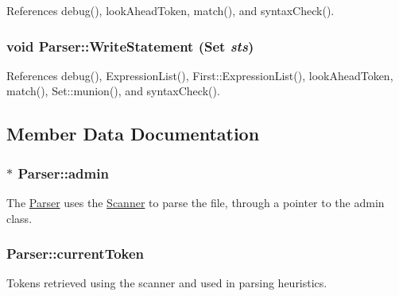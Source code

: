 References debug(), lookAheadToken, match(), and syntaxCheck().

\hypertarget{classParser_a092a51a38e65c3be07328bfc1e370f0e}{
\subsubsection[{WriteStatement}]{\setlength{\rightskip}{0pt plus 5cm}void Parser::WriteStatement ({\bf Set} {\em sts})}}
\label{classParser_a092a51a38e65c3be07328bfc1e370f0e}


References debug(), ExpressionList(), First::ExpressionList(), lookAheadToken, match(), Set::munion(), and syntaxCheck().



\subsection{Member Data Documentation}
\hypertarget{classParser_a96a8ee1229f37648e0ee704827b1c4c7}{
\subsubsection[{admin}]{$\ast$ {\bf Parser::admin}}}
\label{classParser_a96a8ee1229f37648e0ee704827b1c4c7}


The \hyperlink{classParser}{Parser} uses the \hyperlink{classScanner}{Scanner} to parse the file, through a pointer to the admin class. 

\hypertarget{classParser_a8180cecab442c4c7f582bbe1d0682bf1}{
\subsubsection[{currentToken}]{ {\bf Parser::currentToken}}}
\label{classParser_a8180cecab442c4c7f582bbe1d0682bf1}


Tokens retrieved using the scanner and used in parsing heuristics. 

